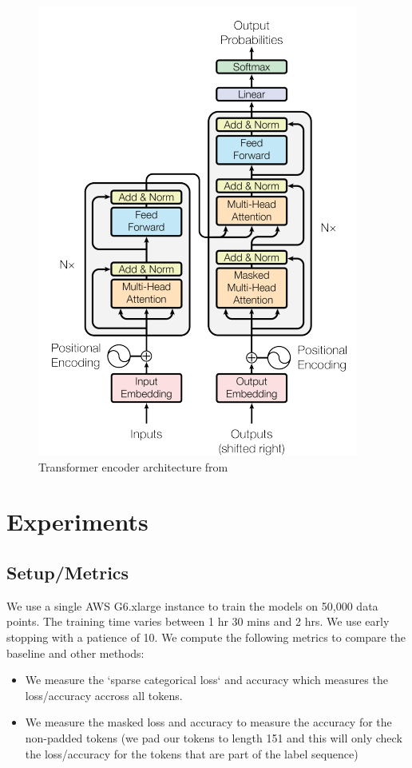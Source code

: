 \documentclass{article}
\begin{document}
\begin{figure}[H]
	\centering \includegraphics[scale=0.7]{transformer_decoder.png}
	\caption{Transformer encoder architecture from \cite{transformer}}
\end{figure}


\section{Experiments}

\subsection{Setup/Metrics}

We use a single AWS G6.xlarge instance to train the models on 50,000 data points. The training time varies between  1 hr 30 mins and 2 hrs. We use early stopping with a patience of 10. We compute the following metrics to compare the baseline and other methods:

\begin{itemize}
  \item We measure the `sparse categorical loss` and accuracy which measures the loss/accuracy accross all tokens. 
  \item We measure the masked loss and accuracy to measure the accuracy for the non-padded tokens (we pad our tokens to length 151 and this will only check the loss/accuracy for the tokens that are part of the label sequence)
\end{itemize}
\end{document}
